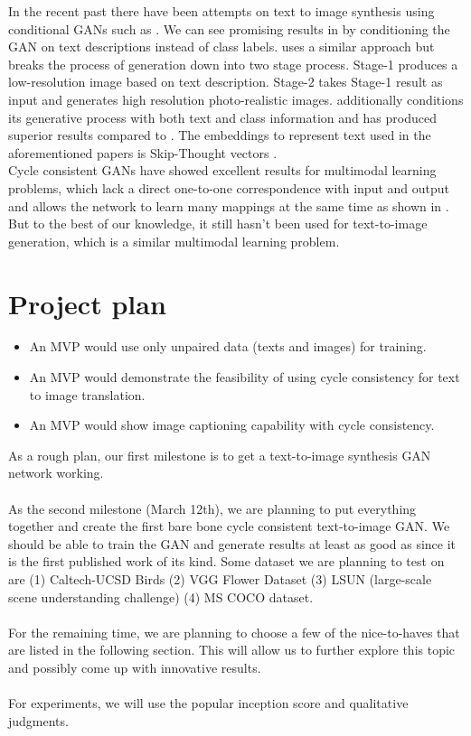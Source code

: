 \documentclass[]{article}
\begin{document}
In the recent past there have been attempts on text to image synthesis using conditional GANs such as \cite{reed2016generative}\cite{dash2017tac}\cite{zhang2017stackgan}\cite{DBLP:journals/corr/abs-1710-10916}. We can see promising results in \cite{reed2016generative} by conditioning the GAN on text descriptions instead of class labels. \cite{zhang2017stackgan} uses a similar approach but breaks the process of generation down into two stage process. Stage-1 produces a low-resolution image based on text description. Stage-2 takes Stage-1 result as input and generates high resolution photo-realistic images. \cite{dash2017tac} additionally conditions its generative process with both text and class information and has produced superior results compared to \cite{reed2016generative}. The embeddings to represent text used in the aforementioned papers is Skip-Thought vectors \cite{kiros2015skip}.
\\

Cycle consistent GANs have showed excellent results for multimodal learning problems, which lack a direct one-to-one correspondence with input and output and allows the network to learn many mappings at the same time as shown in \cite{zhu2017unpaired}\cite{liu2017unsupervised}\cite{zhou2016learning}. But to the best of our knowledge, it still hasn't been used for text-to-image generation, which is a similar multimodal learning problem.
\\
\section{Project plan}
\begin{itemize}
	\item An MVP would use only unpaired data (texts and images) for training.
	\item An MVP would demonstrate the feasibility of using cycle consistency for text to image translation.
	\item An MVP would show image captioning capability with cycle consistency.
\end{itemize}
	As a rough plan, our first milestone is to get a text-to-image synthesis GAN network working.\\
	\\
	As the second milestone (March 12th), we are planning to put everything together and create the first bare bone cycle consistent text-to-image GAN. We should be able to train the GAN and generate results at least as good as \cite{reed2016generative} since it is the first published work of its kind. Some dataset we are planning to test on are (1) Caltech-UCSD Birds (2) VGG Flower Dataset (3) LSUN (large-scale scene understanding challenge) (4) MS COCO dataset.\\
	\\
	For the remaining time, we are planning to choose a few of the nice-to-haves that are listed in the following section. This will allow us to further explore this topic and possibly come up with innovative results.\\
	\\
	For experiments, we will use the popular inception score and qualitative judgments.
\end{document}
